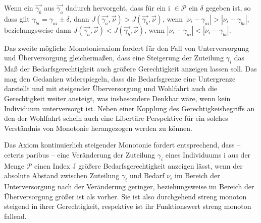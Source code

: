 \documentclass[a4paper]{thesis}
\begin{document}
\begin{Axiom}
Wenn ein $\vec{\gamma_b}$ aus $\vec{\gamma_a}$ dadurch hervorgeht, dass für ein i $\in\mathcal{P}$ ein $\delta$ gegeben ist, so dass gilt $\gamma_{bi}=\gamma_{ai}\pm\delta$, dann $J(\vec{\gamma_a},\vec{\nu})>J(\vec{\gamma_b},\vec{\nu})$, wenn $|\nu_i - \gamma_{ai}|>|\nu_i - \gamma_{bi}|$, beziehungsweise dann $J(\vec{\gamma_a},\vec{\nu})<J(\vec{\gamma_b},\vec{\nu})$, wenn $|\nu_i - \gamma_{ai}|<|\nu_i - \gamma_{bi}|$.
\end{Axiom}

Das zweite mögliche Monotonieaxiom fordert für den Fall von Unterversorgung und Überversorgung gleichermaßen, dass eine Steigerung der Zuteilung $\gamma_i$ das Maß der Bedarfsgerechtigkeit auch größere Gerechtigkeit anzeigen lassen soll. Das mag den Gedanken widerspiegeln, dass die Bedarfsgrenze eine Untergrenze darstellt und mit steigender Überversorgung und Wohlfahrt auch die Gerechtigkeit weiter ansteigt, was insbesondere Denkbar wäre, wenn kein Individuum unterversorgt ist. Neben einer Kopplung des Gerechtigkeisbegriffs an den der Wohlfahrt schein auch eine Libertäre Perspektive für ein solches Verständnis von Monotonie herangezogen werden zu können.

Das Axiom kontinuierlich steigender Monotonie fordert entsprechend, dass -- ceteris paribus -- eine Veränderung der Zuteilung $\gamma_i$ eines Individuums i aus der Menge $\mathcal{P}$ einen Index J größere Bedarfsgerechtigkeit anzeigen lässt, wenn der absolute Abstand zwischen Zuteilung $\gamma_i$ und Bedarf $\nu_i$ im Bereich der Unterversorgung nach der Veränderung geringer, beziehungsweise im Bereich der Überversorgung größer ist als vorher. Sie ist also durchgehend streng monoton steigend in ihrer Gerechtigkeit, respektive ist ihr Funktionswert streng monoton fallend.
\end{document}
